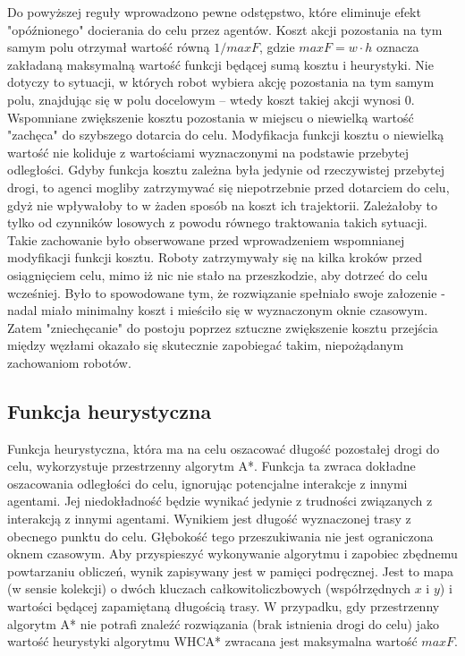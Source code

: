 Do powyższej reguły wprowadzono pewne odstępstwo, które eliminuje efekt "opóźnionego" docierania do celu przez agentów.
Koszt akcji pozostania na tym samym polu otrzymał wartość równą $1 / maxF$, gdzie $maxF = w \cdot h$ oznacza zakładaną maksymalną wartość funkcji będącej sumą kosztu i heurystyki.
Nie dotyczy to sytuacji, w których robot wybiera akcję pozostania na tym samym polu, znajdując się w polu docelowym -- wtedy koszt takiej akcji wynosi 0.
Wspomniane zwiększenie kosztu pozostania w miejscu o niewielką wartość "zachęca" do szybszego dotarcia do celu.
Modyfikacja funkcji kosztu o niewielką wartość nie koliduje z wartościami wyznaczonymi na podstawie przebytej odległości.
Gdyby funkcja kosztu zależna była jedynie od rzeczywistej przebytej drogi, to agenci mogliby zatrzymywać się niepotrzebnie przed dotarciem do celu, gdyż nie wpływałoby to w żaden sposób na koszt ich trajektorii. Zależałoby to tylko od czynników losowych z powodu równego traktowania takich sytuacji.
Takie zachowanie było obserwowane przed wprowadzeniem wspomnianej modyfikacji funkcji kosztu.
Roboty zatrzymywały się na kilka kroków przed osiągnięciem celu, mimo iż nic nie stało na przeszkodzie, aby dotrzeć do celu wcześniej. Było to spowodowane tym, że rozwiązanie spełniało swoje załozenie - nadal miało minimalny koszt i mieściło się w wyznaczonym oknie czasowym.
Zatem "zniechęcanie" do postoju poprzez sztuczne zwiększenie kosztu przejścia między węzłami okazało się skutecznie zapobiegać takim, niepożądanym zachowaniom robotów.

\subsection{Funkcja heurystyczna}
Funkcja heurystyczna, która ma na celu oszacować długość pozostałej drogi do celu, wykorzystuje przestrzenny algorytm A*.
Funkcja ta zwraca dokładne oszacowania odległości do celu, ignorując potencjalne interakcje z innymi agentami. Jej niedokładność będzie wynikać jedynie z trudności związanych z interakcją z innymi agentami.
Wynikiem jest długość wyznaczonej trasy z obecnego punktu do celu.
Głębokość tego przeszukiwania nie jest ograniczona oknem czasowym.
Aby przyspieszyć wykonywanie algorytmu i zapobiec zbędnemu powtarzaniu obliczeń, wynik zapisywany jest w pamięci podręcznej.
Jest to mapa (w sensie kolekcji) o dwóch kluczach całkowitoliczbowych (współrzędnych $x$ i $y$) i wartości będącej zapamiętaną długością trasy.
W przypadku, gdy przestrzenny algorytm A* nie potrafi znaleźć rozwiązania (brak istnienia drogi do celu) jako wartość heurystyki algorytmu WHCA* zwracana jest maksymalna wartość $maxF$.

